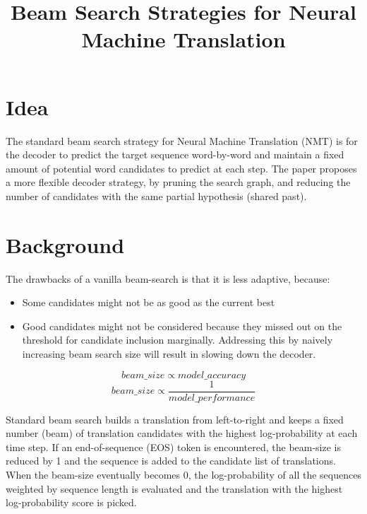 \documentclass[12pt]{article}
\begin{document}
\title{Beam Search Strategies for Neural Machine Translation}
\author{}
\date{}
\maketitle

\section{Idea}
The standard beam search strategy for Neural Machine Translation (NMT) is for the decoder to predict the target sequence word-by-word and maintain a fixed amount of potential word candidates to predict at each step. The paper proposes a more flexible decoder strategy, by pruning the search graph, and reducing the number of candidates with the same partial hypothesis (shared past).


\section{Background}

The drawbacks of a vanilla beam-search is that it is less adaptive, because: 
  \begin{itemize}
    \item Some candidates might not be as good as the current best
    \item Good candidates might not be considered because they missed out on the threshold for candidate inclusion marginally. Addressing this by naively increasing beam search size will result in slowing down the decoder.
  \end{itemize}
    
$$beam\_size \propto model\_accuracy$$
$$beam\_size \propto \frac{1}{model\_performance}$$
    
Standard beam search builds a translation from left-to-right and keeps a fixed number (beam) of translation candidates with the highest log-probability at each time step. If an end-of-sequence (EOS) token is encountered, the beam-size is reduced by 1 and the sequence is added to the candidate list of translations. When the beam-size eventually becomes 0, the log-probability of all the sequences weighted by sequence length is evaluated and the translation with the highest log-probability score is picked.
\end{document}
